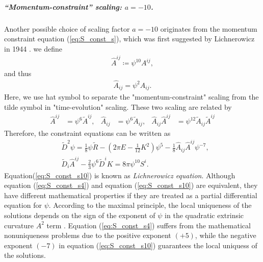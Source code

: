 \subparagraph{“Momentum-constraint” scaling: $a=-10$.}
Another possible choice of scaling factor $a=-10$ originates from the momentum constraint equation (\ref{eq:S_const_s}),
which was first suggested by Lichnerowicz in 1944 \cite{lichnerowicz1944integration}.
we define
\begin{align}
    \hat{A}^{ij} \coloneqq \psi^{10} A^{ij},
\end{align}
and thus
\begin{align}
    \hat{A}_{ij} = \psi^{2} A_{ij}.
\end{align}
Here, we use hat symbol to separate the "momentum-constraint" scaling from the tilde symbol in "time-evolution" scaling.
These two scaling are related by
\begin{align}
    \hat{A}^{ij}&= \psi^6\tilde{A}^{ij}, &\hat{A}_{ij} &= \psi^6 \tilde{A}_{ij}, &\hat{A}_{ij} \hat{A}^{ij} &= \psi^{12} \tilde{A}_{ij} \tilde{A}^{ij}
\end{align}
Therefore, the constraint equations can be written as
\begin{align}
    &\tilde{D}^2 \psi = \frac{1}{8} \psi \tilde{R} - \left( 2\pi E - \frac{1}{12}K^2 \right) \psi^5 - \frac{1}{8} \hat{A}_{ij} \hat{A}^{ij} \psi^{-7}, 
    \label{eq:H_const_s10}\\
    &\tilde{D}_i \hat{A}^{ij} - \frac{2}{3}\psi^6 \tilde{D}^i K = 8\pi \psi^{10} S^i.\label{eq:S_const_s10}
\end{align}
Equation(\ref{eq:S_const_s10}) is known as \textit{Lichnerowicz equation}.
Although equation (\ref{eq:S_const_s4}) and equation (\ref{eq:S_const_s10}) are equivalent,
they have different mathematical properties if they are treated as a partial differential equation for $\psi$.
According to the maximal principle,
the local uniqueness of the solutions depends on the sign of the exponent of $\psi$ in the quadratic extrinsic curvature $A^2$ term 
\cite{cordero2009improved,smarr1979sources,taylor1991partial,evans1997partial,protter2012maximum}.
Equation (\ref{eq:S_const_s4}) suffers from the mathematical nonuniqueness problems due to the positive exponent $(+5)$,
while the negative exponent $(-7)$ in equation (\ref{eq:S_const_s10}) guarantees the local uniquess of the solutions.

